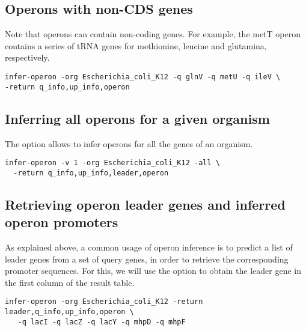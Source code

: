 \subsection{Operons with non-CDS genes}

Note that operons can contain non-coding genes. For example, the
metT operon contains a series of tRNA genes for methionine, leucine
and glutamina, respectively.

{\color{Blue} \begin{footnotesize}
\begin{verbatim}
infer-operon -org Escherichia_coli_K12 -q glnV -q metU -q ileV \
-return q_info,up_info,operon
\end{verbatim} \end{footnotesize}
}

\subsection{Inferring all operons for a given organism}

The option  allows to infer operons for all the genes of
an organism.

{\color{Blue} \begin{footnotesize}
\begin{verbatim}
infer-operon -v 1 -org Escherichia_coli_K12 -all \
  -return q_info,up_info,leader,operon
\end{verbatim} \end{footnotesize}
}

\subsection{Retrieving operon leader genes and inferred
  operon promoters}

As explained above, a common usage of operon inference is to predict a
list of leader genes from a set of query genes, in order to retrieve
the corresponding promoter sequences. For this, we will use the option
\option{-return} to obtain the leader gene in the first column of the
result table. 

{\color{Blue} \begin{footnotesize}
\begin{verbatim}
infer-operon -org Escherichia_coli_K12 -return leader,q_info,up_info,operon \
   -q lacI -q lacZ -q lacY -q mhpD -q mhpF
\end{verbatim} \end{footnotesize}
}

